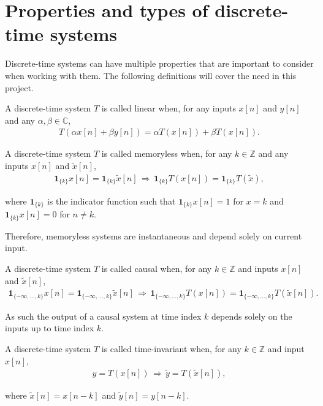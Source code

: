 \section{Properties and types of discrete-time systems}\label{sec:properties_DTS}
Discrete-time systems can have multiple properties that are important to consider when working with them. The following definitions will cover the need in this project.
\begin{definition}\label{def:linear_system}
A discrete-time system $T$ is called linear when, for any inputs $x[n]$ and $y[n]$ and any $\alpha,\beta\in\mathbb{C}$,
\begin{align}
T(\alpha x[n] + \beta y[n]) = \alpha T(x[n]) + \beta T(x[n]).
\end{align}
\end{definition}

\begin{definition}\label{def:memoryless_system}
A discrete-time system $T$ is called memoryless when, for any $k\in\mathbb{Z}$ and any inputs $x[n]$ and $\tilde{x}[n]$,
\begin{align}
\mathbf{1}_{\{k\}}x[n] = \mathbf{1}_{\{k\}}\tilde{x}[n] \, \Rightarrow \, \mathbf{1}_{\{k\}} T(x[n]) = \mathbf{1}_{\{k\}}T(\tilde{x}),
\end{align}

where $\mathbf{1}_{\{k\}}$ is the indicator function such that $\mathbf{1}_{\{k\}}x[n]=1$ for $x=k$ and $\mathbf{1}_{\{k\}}x[n]=0$ for $n \neq k$.
\end{definition}

Therefore, memoryless systems are instantaneous and depend solely on current input.

\begin{definition}\label{def:causal_system}
A discrete-time system $T$ is called causal when, for any $k\in\mathbb{Z}$ and inputs $x[n]$ and $\tilde{x}[n]$,
\begin{align}
\mathbf{1}_{\{-\infty,\ldots,k\}} x[n] = \mathbf{1}_{\{-\infty,\ldots,k\}} \tilde{x}[n] \, \Rightarrow \, \mathbf{1}_{\{-\infty,\ldots,k\}} T(x[n]) = \mathbf{1}_{\{-\infty,\ldots,k\}} T(\tilde{x}[n]).
\end{align}
\end{definition}

As such the output of a causal system at time index $k$ depends solely on the inputs up to time index $k$.

\begin{definition}\label{def:time_invariant_system}
A discrete-time system $T$ is called time-invariant when, for any $k\in\mathbb{Z}$ and input $x[n]$,
\begin{align}
y = T(x[n]) \, \Rightarrow \, \tilde{y} = T(\tilde{x}[n]),
\end{align}

where $\tilde{x}[n] = x[n-k]$ and $\tilde{y}[n] = y[n-k]$.
\end{definition}

